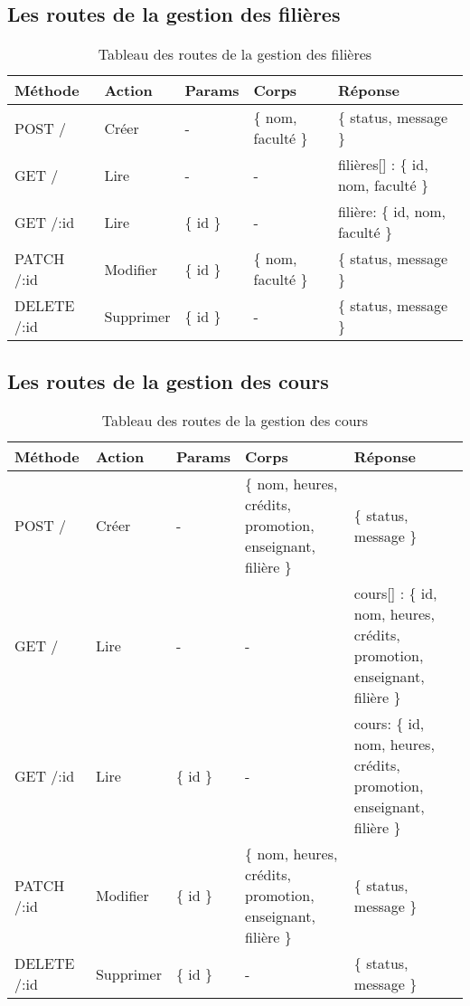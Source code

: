 \subsection{Les routes de la gestion des filières}\label{subsec:routes-field}

\begin{table}[ht]
  \caption{Tableau des routes de la gestion des filières}
  \label{tab:routes-field}
  \begin{tabular}{|p{1.5cm}|p{1.5cm}|p{1.5cm}|p{2.5cm}|p{3cm}|}
    \hline
      Méthode & Action & Params & Corps & Réponse \\
    \hline
        POST / & Créer &  - & \{ nom, faculté \} & \{ status, message \} \\
    \hline
        GET / & Lire & - & - & filières[] : \{ id, nom, faculté \}  \\
    \hline
        GET /:id & Lire & \{ id \} & - & filière: \{ id, nom, faculté \} \\
    \hline
        PATCH /:id & Modifier & \{ id \} & \{ nom, faculté \} & \{ status, message \} \\
    \hline
        DELETE /:id & Supprimer & \{ id \} & - & \{ status, message \} \\
    \hline
  \end{tabular}
\end{table}
\pagebreak

\subsection{Les routes de la gestion des cours}\label{subsec:routes-course}

\begin{table}[ht]
  \caption{Tableau des routes de la gestion des cours}
  \label{tab:routes-course}
  \begin{tabular}{|p{1.5cm}|p{1.5cm}|p{1.5cm}|p{2.5cm}|p{3cm}|}
    \hline
      Méthode & Action & Params & Corps & Réponse \\
    \hline
      POST / & Créer &  - &  \{ nom, heures, crédits, promotion, enseignant, filière \} & \{ status, message \} \\
    \hline
        GET /  & Lire & - & - & cours[] :  \{ id, nom, heures, crédits, promotion, enseignant, filière \} \\
    \hline
        GET /:id & Lire & \{ id \} & - & cours: \{ id, nom, heures, crédits, promotion, enseignant, filière \} \\
    \hline
        PATCH /:id & Modifier  & \{ id \} &  \{ nom, heures, crédits, promotion, enseignant, filière \} & \{ status, message \} \\
    \hline
        DELETE /:id & Supprimer & \{ id \} & - & \{ status, message \} \\
    \hline
  \end{tabular}
\end{table}
\pagebreak

